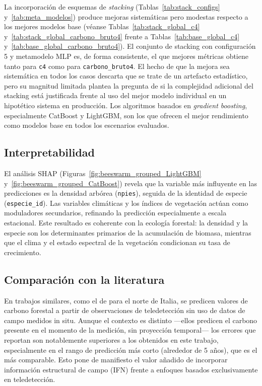 La incorporación de esquemas de \textit{stacking} (Tablas~\ref{tab:stack_configs} y~\ref{tab:meta_modelos}) produce mejoras sistemáticas pero modestas respecto a los mejores modelos base (véanse Tablas~\ref{tab:stack_global_c4} y~\ref{tab:stack_global_carbono_bruto4} frente a Tablas~\ref{tab:base_global_c4} y~\ref{tab:base_global_carbono_bruto4}). El conjunto de stacking con configuración 5 y metamodelo MLP es, de forma consistente, el que mejores métricas obtiene tanto para \texttt{c4} como para \texttt{carbono\_bruto4}. El hecho de que la mejora sea sistemática en todos los casos descarta que se trate de un artefacto estadístico, pero su magnitud limitada plantea la pregunta de si la complejidad adicional del stacking está justificada frente al uso del mejor modelo individual en un hipotético sistema en producción. Los algoritmos basados en \textit{gradient boosting}, especialmente CatBoost y LightGBM, son los que ofrecen el mejor rendimiento como modelos base en todos los escenarios evaluados.

\subsection*{Interpretabilidad}

El análisis SHAP (Figuras~\ref{fig:beeswarm_grouped_LightGBM} y~\ref{fig:beeswarm_grouped_CatBoost}) revela que la variable más influyente en las predicciones es la densidad arbórea (\texttt{npies}), seguida de la identidad de especie (\texttt{especie\_id}). Las variables climáticas y los índices de vegetación actúan como moduladores secundarios, refinando la predicción especialmente a escala estacional. Este resultado es coherente con la ecología forestal: la densidad y la especie son los determinantes primarios de la acumulación de biomasa, mientras que el clima y el estado espectral de la vegetación condicionan su tasa de crecimiento.

\subsection*{Comparación con la literatura}

En trabajos similares, como el de \citet{fasihi2024assessing} para el norte de Italia, se predicen valores de carbono forestal a partir de observaciones de teledetección sin uso de datos de campo medidos in situ. Aunque el contexto es distinto ---ellos predicen el carbono presente en el momento de la medición, sin proyección temporal--- los errores que reportan son notablemente superiores a los obtenidos en este trabajo, especialmente en el rango de predicción más corto (alrededor de 5 años), que es el más comparable. Esto pone de manifiesto el valor añadido de incorporar información estructural de campo (IFN) frente a enfoques basados exclusivamente en teledetección.

